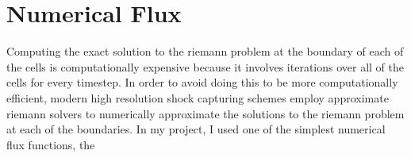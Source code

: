 \section{Numerical Flux}
Computing the exact solution to the riemann problem at the boundary of each of the cells is computationally expensive because it involves iterations over all of the cells for every timestep. In order to avoid doing this to be more computationally efficient, modern high resolution shock capturing schemes employ approximate riemann solvers to numerically approximate the solutions to the riemann problem at each of the boundaries. In my project, I used one of the simplest numerical flux functions, the 
